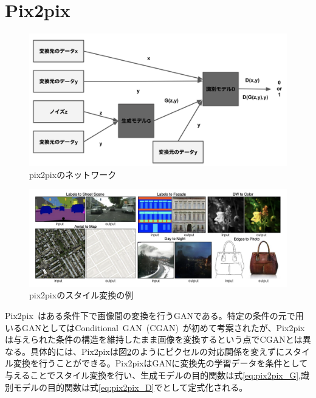 \section{Pix2pix}

\begin{figure}[t]
\begin{center}
\includegraphics[width=\hsize]{figure/pix2pix_net.png}
\caption{pix2pixのネットワーク}
\label{fig:pix2pix_net}
\end{center}
\end{figure}

\begin{figure}[t]
\begin{center}
\includegraphics[width=\hsize]{figure/pix2pix_img.png}
\caption{pix2pixのスタイル変換の例}
\label{fig:pix2pix_img}
\end{center}
\end{figure}

Pix2pix~\cite{pix2pix}はある条件下で画像間の変換を行うGANである。特定の条件の元で用いるGANとしてはConditional~GAN~(CGAN)~\cite{CGAN}が初めて考案されたが、Pix2pixは与えられた条件の構造を維持したまま画像を変換するという点でCGANとは異なる。具体的には、Pix2pixは図\ref{fig:pix2pix_img}のようにピクセルの対応関係を変えずにスタイル変換を行うことができる。Pix2pixはGANに変換先の学習データを条件として与えることでスタイル変換を行い、生成モデルの目的関数は式\ref{eq:pix2pix_G},識別モデルの目的関数は式\ref{eq:pix2pix_D}でとして定式化される。

